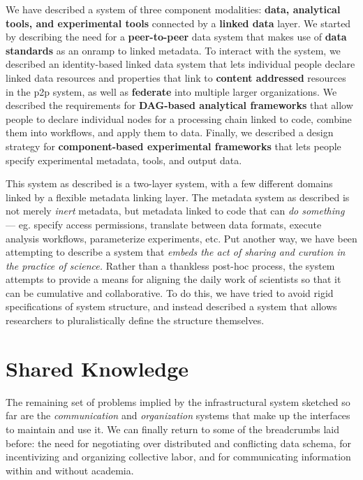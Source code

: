 We have described a system of three component modalities: \textbf{data,
analytical tools, and experimental tools} connected by a \textbf{linked
data} layer. We started by describing the need for a
\textbf{peer-to-peer} data system that makes use of \textbf{data
standards} as an onramp to linked metadata. To interact with the system,
we described an identity-based linked data system that lets individual
people declare linked data resources and properties that link to
\textbf{content addressed} resources in the p2p system, as well as
\textbf{federate} into multiple larger organizations. We described the
requirements for \textbf{DAG-based analytical frameworks} that allow
people to declare individual nodes for a processing chain linked to
code, combine them into workflows, and apply them to data. Finally, we
described a design strategy for \textbf{component-based experimental
frameworks} that lets people specify experimental metadata, tools, and
output data.

This system as described is a two-layer system, with a few different
domains linked by a flexible metadata linking layer. The metadata system
as described is not merely \emph{inert} metadata, but metadata linked to
code that can \emph{do something} --- eg. specify access permissions,
translate between data formats, execute analysis workflows, parameterize
experiments, etc. Put another way, we have been attempting to describe a
system that \emph{embeds the act of sharing and curation in the practice
of science.} Rather than a thankless post-hoc process, the system
attempts to provide a means for aligning the daily work of scientists so
that it can be cumulative and collaborative. To do this, we have tried
to avoid rigid specifications of system structure, and instead described
a system that allows researchers to pluralistically define the structure
themselves.

\hypertarget{shared-knowledge}{%
\section{Shared Knowledge}\label{shared-knowledge}}

The remaining set of problems implied by the infrastructural system
sketched so far are the \emph{communication} and \emph{organization}
systems that make up the interfaces to maintain and use it. We can
finally return to some of the breadcrumbs laid before: the need for
negotiating over distributed and conflicting data schema, for
incentivizing and organizing collective labor, and for communicating
information within and without academia.

